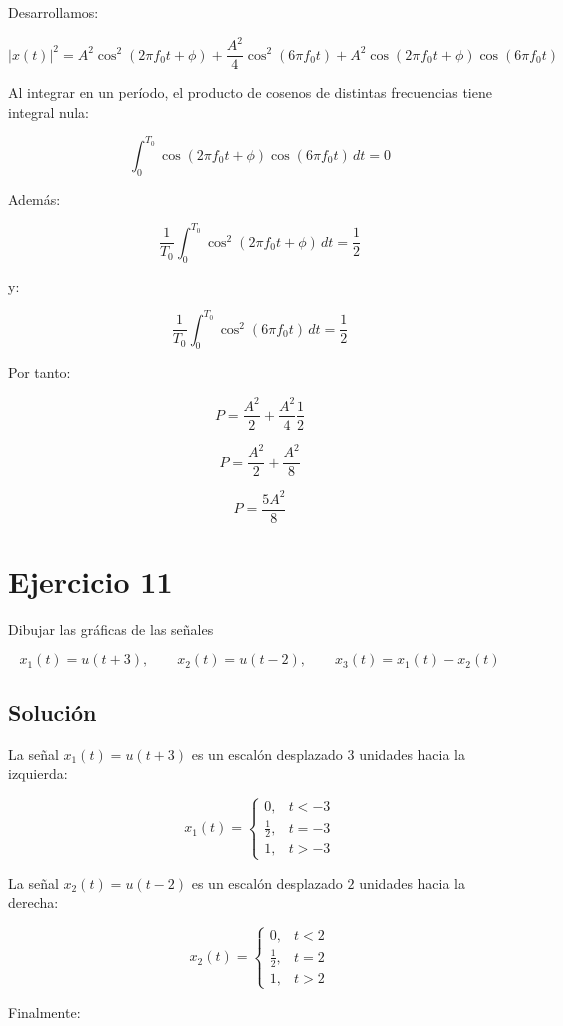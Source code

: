 \documentclass[fleqn]{article}
\begin{document}
	Desarrollamos:

	\[
	|x(t)|^2
	=
	A^2\cos^2(2\pi f_0t+\phi)
	+
	\frac{A^2}{4}\cos^2(6\pi f_0t)
	+
	A^2\cos(2\pi f_0t+\phi)\cos(6\pi f_0t)
	\]

	Al integrar en un período, el producto de cosenos de distintas frecuencias tiene integral nula:

	\[
	\int_0^{T_0}
	\cos(2\pi f_0t+\phi)\cos(6\pi f_0t)\,dt
	=
	0
	\]

	Además:

	\[
	\frac{1}{T_0}
	\int_0^{T_0}
	\cos^2(2\pi f_0t+\phi)\,dt
	=
	\frac{1}{2}
	\]

	y:

	\[
	\frac{1}{T_0}
	\int_0^{T_0}
	\cos^2(6\pi f_0t)\,dt
	=
	\frac{1}{2}
	\]

	Por tanto:

	\[
	P
	=
	\frac{A^2}{2}
	+
	\frac{A^2}{4}\frac{1}{2}
	\]

	\[
	P
	=
	\frac{A^2}{2}
	+
	\frac{A^2}{8}
	\]

	\[
	\boxed{
	P=\frac{5A^2}{8}
	}
	\]

\section{Ejercicio 11}
	Dibujar las gráficas de las señales

	\[
	x_1(t)=u(t+3),
	\qquad
	x_2(t)=u(t-2),
	\qquad
	x_3(t)=x_1(t)-x_2(t)
	\]

	\subsection{Solución}

	La señal $x_1(t)=u(t+3)$ es un escalón desplazado $3$ unidades hacia la izquierda:

	\[
	x_1(t)=
	\begin{cases}
	0, & t<-3 \\[1mm]
	\frac{1}{2}, & t=-3 \\[1mm]
	1, & t>-3
	\end{cases}
	\]

	La señal $x_2(t)=u(t-2)$ es un escalón desplazado $2$ unidades hacia la derecha:

	\[
	x_2(t)=
	\begin{cases}
	0, & t<2 \\[1mm]
	\frac{1}{2}, & t=2 \\[1mm]
	1, & t>2
	\end{cases}
	\]

	Finalmente:
\end{document}
